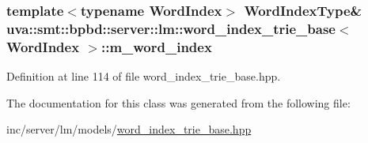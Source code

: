 \subsubsection[{m\+\_\+word\+\_\+index}]{\setlength{\rightskip}{0pt plus 5cm}template$<$typename Word\+Index$>$ {\bf Word\+Index\+Type}\& {\bf uva\+::smt\+::bpbd\+::server\+::lm\+::word\+\_\+index\+\_\+trie\+\_\+base}$<$ Word\+Index $>$\+::m\+\_\+word\+\_\+index\hspace{0.3cm}{\ttfamily [protected]}}\label{classuva_1_1smt_1_1bpbd_1_1server_1_1lm_1_1word__index__trie__base_a14800ace951997474c3a562405b9482e}


Definition at line 114 of file word\+\_\+index\+\_\+trie\+\_\+base.\+hpp.



The documentation for this class was generated from the following file\+:\begin{DoxyCompactItemize}
\item 
inc/server/lm/models/\hyperlink{word__index__trie__base_8hpp}{word\+\_\+index\+\_\+trie\+\_\+base.\+hpp}\end{DoxyCompactItemize}
